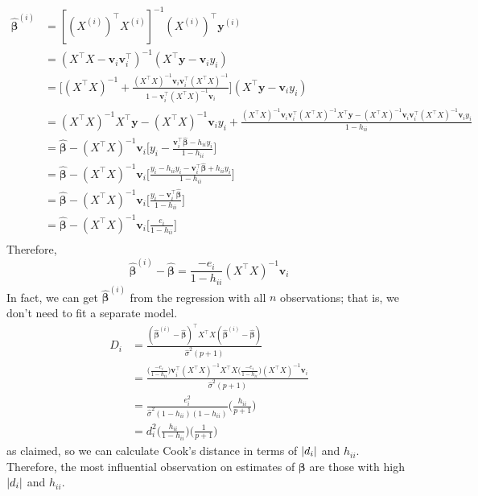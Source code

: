 \begin{align*}
    \hat{\symbf{\beta}}^{(i)}
     & =[(X^{(i)})^\top
    X^{(i)}]^{-1}(X^{(i)})^\top \symbf{y}^{(i)}                                                  \\
     & =(X^\top X-\symbf{v}_i\symbf{v}_i^\top)^{-1}(X^\top \symbf{y}-
    \symbf{v}_i y_i)                                                                             \\
     & =\biggl[(X^\top X)^{-1}+\frac{(X^\top X)^{-1}\symbf{v}_i\symbf{v}_i^\top
            (X^\top X)^{-1}}{1-\symbf{v}_i^\top (X^\top X)^{-1}\symbf{v}_i} \biggr]
    (X^\top \symbf{y}-\symbf{v}_i y_i)                                                           \\
     & =(X^\top X)^{-1}X^\top\symbf{y}-(X^\top X)^{-1}\symbf{v}_i y_i+
    \frac{(X^\top X)^{-1}\symbf{v}_i\symbf{v}_i^\top (X^\top X)^{-1}X^\top\symbf{y}
    -(X^\top X)^{-1}\symbf{v}_i\symbf{v}_i^\top(X^\top X)^{-1}\symbf{v}_i y_i
    }{1-h_{ii}}                                                                                  \\
     & =\hat{\symbf{\beta}}-(X^\top X)^{-1}\symbf{v}_i
    \biggl[y_i-\frac{\symbf{v}_i^\top\hat{\symbf{\beta}}-h_{ii}y_i}{1-h_{ii}} \biggr]            \\
     & =\hat{\symbf{\beta}}-(X^\top X)^{-1}\symbf{v}_i
    \biggl[\frac{y_i-h_{ii}y_i-\symbf{v}_i^\top \hat{\symbf{\beta}}+h_{ii}y_i}{1-h_{ii}} \biggr] \\
     & =\hat{\symbf{\beta}}-(X^\top X)^{-1}\symbf{v}_i
    \biggl[\frac{y_i-\symbf{v}_i^\top \hat{\symbf{\beta}}}{1-h_{ii}} \biggr]                     \\
     & =\hat{\symbf{\beta}}-(X^\top X)^{-1}\symbf{v}_i
    \biggl[\frac{e_i}{1-h_{ii}} \biggr]                                                          \\
\end{align*}
Therefore,
\[ \hat{\symbf{\beta}}^{(i)}-\hat{\symbf{\beta}}=
    \frac{-e_i}{1-h_{ii}}(X^\top X)^{-1}\symbf{v}_i  \]
In fact, we can get $  \hat{\symbf{\beta}}^{(i)} $
from the regression with all $ n $ observations;
that is, we don't need to fit a separate model.
\begin{align*}
    D_i
     & =\frac{(\hat{\symbf{\beta}}^{(i)}-\hat{\symbf{\beta}})^{\top}
        X^\top X(\hat{\symbf{\beta}}^{(i)}-\hat{\symbf{\beta}})}{
    \hat{\sigma}^2(p+1) }                                            \\
     & =\frac{\displaystyle \biggl(\frac{-e_i}{1-h_{ii}} \biggr)
        \symbf{v}_i^\top (X^\top X)^{-1}X^\top X
        \biggl(\frac{-e_i}{1-h_{ii}} \biggr)(X^\top X)^{-1}\symbf{v}_i}{
        \hat{\sigma}^2(p+1)
    }                                                                \\
     & =\frac{e_i^2}{\hat{\sigma}^2(1-h_{ii})(1-h_{ii})}
    \biggl(\frac{h_{ii}}{p+1} \biggr)                                \\
     & =d_i^2\biggl(\frac{h_{ii}}{1-h_{ii}} \biggr)
    \biggl(\frac{1}{p+1} \biggr)
\end{align*}
as claimed, so we can calculate Cook's distance in terms of
$ \lvert d_i\rvert $ and $ h_{ii} $. Therefore, the most influential
observation on estimates of $ \symbf{\beta} $
are those with high $ \lvert d_i\rvert $ and $ h_{ii} $.
